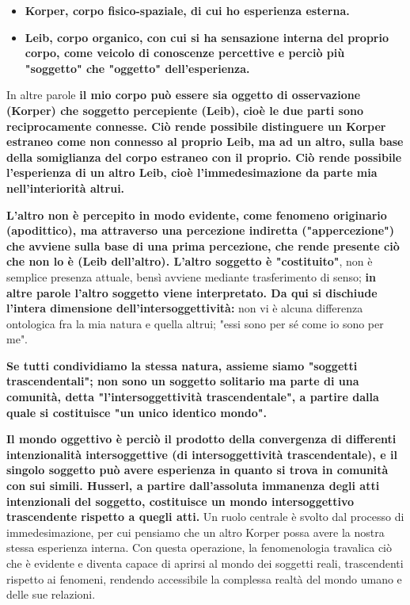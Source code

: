 \begin{itemize}
	\item \textbf{Korper, corpo fisico-spaziale, di cui ho
	esperienza esterna.}
	\item \textbf{Leib, corpo organico, con cui si ha sensazione
	interna del proprio corpo, come veicolo di
	conoscenze percettive e perciò più "soggetto"
	che "oggetto" dell'esperienza.}
\end{itemize}

In altre parole \textbf{il mio corpo può essere sia oggetto
di osservazione (Korper) che soggetto percepiente
(Leib), cioè le due parti sono reciprocamente connesse.
Ciò rende possibile distinguere un Korper estraneo
come non connesso al proprio Leib, ma ad
un altro, sulla base della somiglianza del
corpo estraneo con il proprio. Ciò rende possibile
l'esperienza di un altro Leib, cioè l'immedesimazione
da parte mia nell'interiorità altrui.}

\textbf{L'altro non è percepito in modo evidente, come
fenomeno originario (apodittico), ma attraverso
una percezione indiretta ("appercezione") che
avviene sulla base di una prima percezione, che
rende presente ciò che non lo è (Leib dell'altro).
L'altro soggetto è "costituito"}, non è semplice
presenza attuale, bensì avviene mediante
trasferimento di senso;\textbf{ in altre parole l'altro soggetto viene interpretato.
Da qui si dischiude l'intera dimensione dell'intersoggettività:} non vi è alcuna differenza
ontologica fra la mia natura e quella altrui;
"essi sono per sé come io sono per me".

\textbf{Se tutti condividiamo la stessa natura, assieme
siamo "soggetti trascendentali"; non sono
un soggetto solitario ma parte di una
comunità, detta "l'intersoggettività trascendentale",
a partire dalla quale si costituisce "un unico
identico mondo".}

\textbf{Il mondo oggettivo è perciò il prodotto della
convergenza di differenti intenzionalità
intersoggettive (di intersoggettività trascendentale),
e il singolo soggetto può avere esperienza in
quanto si trova in comunità con sui simili.
Husserl, a partire dall'assoluta immanenza degli atti
intenzionali del soggetto, costituisce un mondo
intersoggettivo trascendente rispetto a quegli atti.}
Un ruolo centrale è svolto dal processo di
immedesimazione, per cui pensiamo che un
altro Korper possa avere la nostra stessa
esperienza interna. Con questa operazione, la
fenomenologia travalica ciò che è evidente
e diventa capace di aprirsi al mondo dei
soggetti reali, trascendenti rispetto ai
fenomeni, rendendo accessibile la complessa
realtà del mondo umano e delle sue relazioni.

